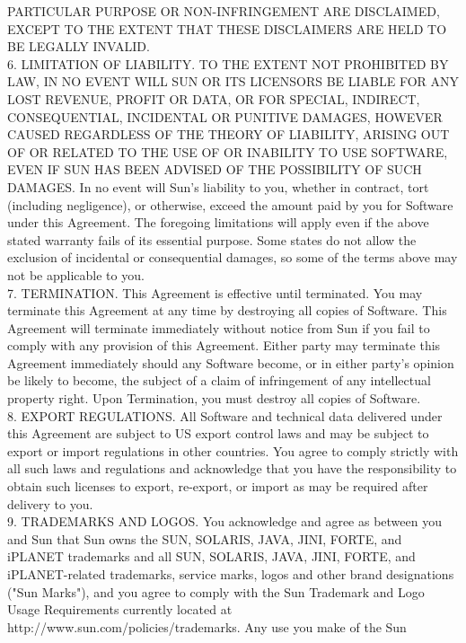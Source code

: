 {   PARTICULAR PURPOSE OR NON-INFRINGEMENT ARE DISCLAIMED, EXCEPT TO
   THE EXTENT THAT THESE DISCLAIMERS ARE HELD TO BE LEGALLY INVALID.
\\[4pt]
   6. LIMITATION OF LIABILITY. TO THE EXTENT NOT PROHIBITED BY LAW, IN
   NO EVENT WILL SUN OR ITS LICENSORS BE LIABLE FOR ANY LOST REVENUE,
   PROFIT OR DATA, OR FOR SPECIAL, INDIRECT, CONSEQUENTIAL, INCIDENTAL
   OR PUNITIVE DAMAGES, HOWEVER CAUSED REGARDLESS OF THE THEORY OF
   LIABILITY, ARISING OUT OF OR RELATED TO THE USE OF OR INABILITY TO
   USE SOFTWARE, EVEN IF SUN HAS BEEN ADVISED OF THE POSSIBILITY OF
   SUCH DAMAGES. In no event will Sun's liability to you, whether in
   contract, tort (including negligence), or otherwise, exceed the
   amount paid by you for Software under this Agreement. The foregoing
   limitations will apply even if the above stated warranty fails of
   its essential purpose. Some states do not allow the exclusion of
   incidental or consequential damages, so some of the terms above may
   not be applicable to you.
\\[4pt]
   7. TERMINATION. This Agreement is effective until terminated. You
   may terminate this Agreement at any time by destroying all copies
   of Software. This Agreement will terminate immediately without
   notice from Sun if you fail to comply with any provision of this
   Agreement. Either party may terminate this Agreement immediately
   should any Software become, or in either party's opinion be likely
   to become, the subject of a claim of infringement of any
   intellectual property right. Upon Termination, you must destroy all
   copies of Software.
\\[4pt]
   8. EXPORT REGULATIONS. All Software and technical data delivered
   under this Agreement are subject to US export control laws and may
   be subject to export or import regulations in other countries. You
   agree to comply strictly with all such laws and regulations and
   acknowledge that you have the responsibility to obtain such
   licenses to export, re-export, or import as may be required after
   delivery to you.
\\[4pt]
   9. TRADEMARKS AND LOGOS. You acknowledge and agree as between you
   and Sun that Sun owns the SUN, SOLARIS, JAVA, JINI, FORTE, and
   iPLANET trademarks and all SUN, SOLARIS, JAVA, JINI, FORTE, and
   iPLANET-related trademarks, service marks, logos and other brand
   designations ("Sun Marks"), and you agree to comply with the Sun
   Trademark and Logo Usage Requirements currently located at
   http://www.sun.com/policies/trademarks. Any use you make of the Sun
}
